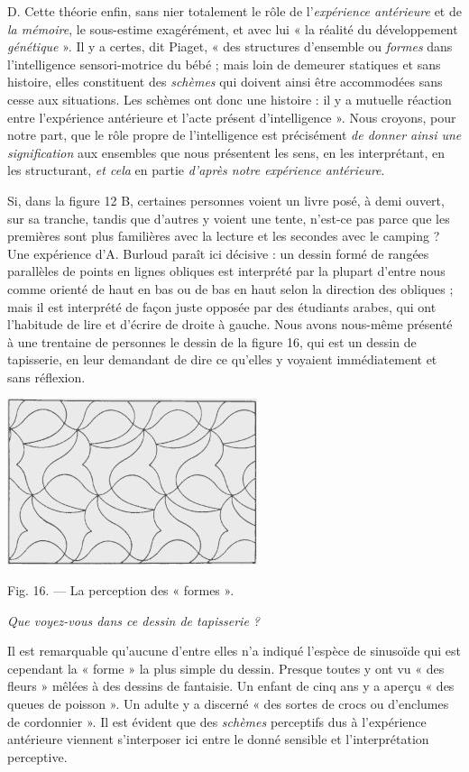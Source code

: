D. Cette théorie enfin, sans nier totalement le rôle de l’{\it expérience
antérieure} et de {\it la mémoire}, le sous-estime exagérément, et avec lui
« la réalité du développement {\it génétique} ». Il y a certes, dit Piaget,
« des structures d’ensemble ou {\it formes} dans l'intelligence sensori-motrice
du bébé ; mais loin de demeurer statiques et sans histoire,
elles constituent des {\it schèmes} qui doivent ainsi être accommodées
sans cesse aux situations. Les schèmes ont donc une histoire : il y a
mutuelle réaction entre l’expérience antérieure et l’acte présent d’intelligence ».
Nous croyons, pour notre part, que le rôle propre de
l'intelligence est précisément {\it de donner ainsi une signification} aux
ensembles que nous présentent les sens, en les interprétant, en les
structurant, {\it et cela} en partie {\it d’après notre expérience antérieure}.

\vspace{0.24cm}
{\footnotesize 
Si, dans la figure 12 B, certaines personnes voient un livre posé, à demi
ouvert, sur sa tranche, tandis que d’autres y voient une tente, n’est-ce pas
parce que les premières sont plus familières avec la lecture et les secondes
avec le camping ? Une expérience d'A. Burloud paraît ici décisive : un
dessin formé de rangées parallèles de points en lignes obliques est interprété
par la plupart d’entre nous comme orienté de haut en bas ou de bas en
haut selon la direction des obliques ; mais il est interprété de façon juste
opposée par des étudiants arabes, qui ont l'habitude de lire et d'écrire de
droite à gauche. Nous avons nous-même présenté à une trentaine de personnes
le dessin de la figure 16, qui est un dessin de tapisserie, en leur
demandant de dire ce qu’elles y voyaient immédiatement et sans réflexion.

\begin{center}
\includegraphics[scale=1.3]{./05_sensible/016}

Fig. 16. — La perception des « formes ».

{\it Que voyez-vous dans ce dessin de tapisserie ?}
\end{center}

Il est remarquable qu'aucune d’entre elles n’a indiqué l’espèce de sinusoïde
qui est cependant la « forme » la plus simple du dessin. Presque toutes y
ont vu « des fleurs » mêlées à des dessins de fantaisie. Un enfant de cinq ans
y a aperçu « des queues de poisson ». Un adulte y a discerné « des sortes de
crocs ou d’enclumes de cordonnier ». Il est évident que des {\it schèmes} perceptifs
dus à l'expérience antérieure viennent s’interposer ici entre le donné
sensible et l'interprétation perceptive.}
\vspace{0.31cm}

